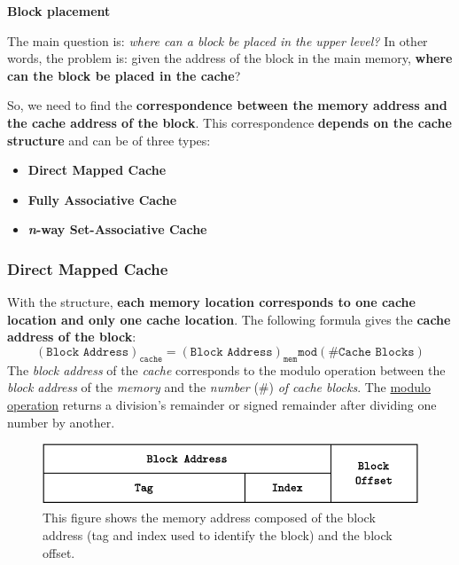 \newpage

\begin{center}
    \large
    \textcolor{Red2}{\textbf{Block placement}}
    \label{Block placement}
\end{center}

\noindent
The main question is: \emph{where can a block be placed in the upper level?} In other words, the problem is: given the address of the block in the main memory, \textbf{where can the block be placed in the cache}?

\highspace
So, we need to find the \textbf{correspondence between the memory address and the cache address of the block}. This correspondence \textbf{depends on the cache structure} and can be of three types:
\begin{itemize}
    \item \textbf{Direct Mapped Cache}
    \item \textbf{Fully Associative Cache}
    \item \textbf{\emph{n}-way Set-Associative Cache}
\end{itemize}

\subsubsection*{\textcolor{Red2}{Direct Mapped Cache}}\label{Direct Mapped Cache}

With the  structure, \textbf{each memory location corresponds to one cache location and only one cache location}. The following formula gives the \textbf{cache address of the block}:
\begin{equation}\label{eq: direct mapped cache}
    \left(\texttt{Block Address}\right)_{\texttt{cache}} = \left(\texttt{Block Address}\right)_{\texttt{mem}} \texttt{mod} \left(\texttt{\# Cache Blocks}\right)
\end{equation}
The \emph{block address} of the \emph{cache} corresponds to the modulo operation between the \emph{block address} of the \emph{memory} and the \emph{number} (\#) \emph{of cache blocks}. The \href{https://en.wikipedia.org/wiki/Modulo}{modulo operation} returns a division's remainder or signed remainder after dividing one number by another.

\begin{figure}[!htp]
    \centering
    \includegraphics[width=.9\textwidth]{img/direct-mapped-cache-1.pdf}
    \caption{This figure shows the memory address composed of the block address (tag and index used to identify the block) and the block offset.}
    \label{fig: Memory Address - Direct Mapped Cache}
\end{figure}

